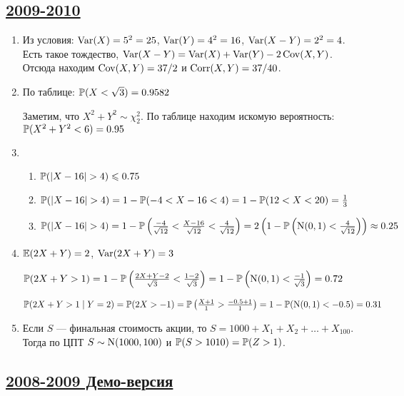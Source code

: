\subsection[2009-2010]{\hyperref[sec:kr_01_2009_2010]{2009-2010}}
\label{sec:sol_kr_01_2009_2010}

\begin{enumerate}
\item Из условия: $\Var(X) = 5^2 = 25$, $\Var(Y) = 4^2 = 16$, $\Var(X - Y) = 2^2 = 4$.
Есть такое тождество, $\Var(X - Y) = \Var(X) + \Var(Y) - 2\Cov(X,Y)$. Отсюда находим
$\Cov(X, Y) = 37/2$ и $\Corr(X, Y) = 37/40$.
\item По таблице: $\P(X<\sqrt{3}) = 0.9582$

Заметим, что $X^2 + Y^2 \sim \chi^2_2$. По таблице находим искомую вероятность:
$\P(X^2 + Y^2<6) = 0.95$
\item
\begin{enumerate}
\item $\P(|X - 16| > 4) \leq 0.75$
\item $\P(|X - 16| > 4) = 1 - \P(-4 < X-16 < 4) = 1 - \P(12 < X < 20) = \frac{1}{3}$
\item $\P(|X - 16| > 4) =  1 - \P\left(\frac{-4}{\sqrt{12}} < \frac{X-16}{\sqrt{12}}
< \frac{4}{\sqrt{12}}\right) = 2 \left(1 - \P\left(\cN(0, 1)<\frac{4}{\sqrt{12}}\right)\right) \approx 0.25$
\end{enumerate}
\item $\E(2X + Y) = 2$, $\Var(2X + Y) = 3$

$\P(2X+Y>1) = 1 - \P\left(\frac{2X+Y - 2}{\sqrt{3}} < \frac{1-2}{\sqrt{3}}\right) =
1 - \P\left(\cN(0,1) < \frac{-1}{\sqrt{3}}\right)= 0.72$

$\P(2X+Y>1 \mid Y=2) = \P(2X>-1) = \P\left(\frac{X+1}{1} > \frac{-0.5+1}{1} \right) =
1 - \P(\cN(0,1)< -0.5) = 0.31$
\item Если $S$ — финальная стоимость акции, то $S = 1000 + X_1 + X_2 + \ldots + X_{100}$.
Тогда по ЦПТ $S\sim \cN(1000,100)$ и $\P(S > 1010) = \P(Z > 1)$.
\end{enumerate}



\subsection[2008-2009 Демо-версия]{\hyperref[sec:kr_02_2008_2009_demo]{2008-2009 Демо-версия}}
\label{sec:sol_kr_02_2008_2009_demo}

